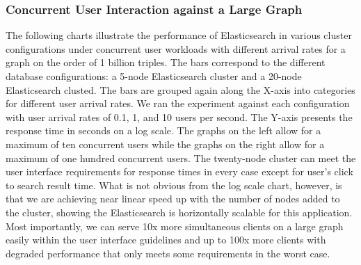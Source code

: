 \subsubsection{Concurrent User Interaction against a Large Graph}
The following charts illustrate the performance of Elasticsearch in various cluster configurations under concurrent user workloads with different arrival rates for a graph on the order of 1 billion triples. 
The bars correspond to the different database configurations: a 5-node Elasticsearch cluster and a 20-node Elasticsearch clusted. 
The bars are grouped again along the X-axis into categories for different user arrival rates. 
We ran the experiment against each configuration with user arrival rates of 0.1, 1, and 10 users per second. 
The Y-axis presents the response time in seconds on a log scale.  
The graphs on the left allow for a maximum of ten concurrent users while the graphs on the right allow for a maximum of one hundred concurrent users.  
The twenty-node cluster can meet the user interface requirements for response times in every case except for user's click to search result time.  
What is not obvious from the log scale chart, however, is that we are achieving near linear speed up with the number of nodes added to the cluster, showing the Elasticsearch is horizontally scalable for this application.
Most importantly, we can serve 10x more simultaneous clients on a large graph easily within the user interface guidelines and up to 100x more clients with degraded performance that only meets some requirements in the worst case.  
